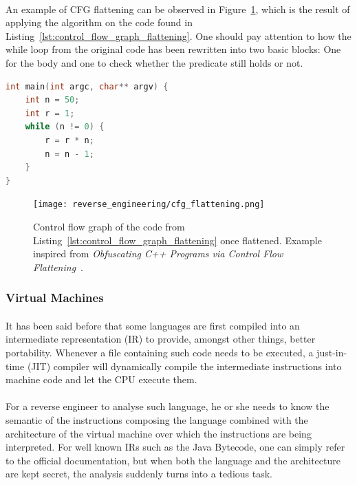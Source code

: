 \paragraph{}
An example of CFG flattening can be observed in Figure~\ref{fig:control_flow_graph_flattening}, which is the result of applying the algorithm on the code found in Listing~\ref{lst:control_flow_graph_flattening}. One should pay attention to how the while loop from the original code has been rewritten into two basic blocks: One for the body and one to check whether the predicate still holds or not.

\pagebreak

\begin{lstlisting}[caption={Simple code to compute the factorial of 50.}, label={lst:control_flow_graph_flattening}, frame=tlrb, language=C]
int main(int argc, char** argv) {
	int n = 50;
	int r = 1;
	while (n != 0) {
		r = r * n;
		n = n - 1;
	}
}
\end{lstlisting}

\begin{figure}[!htb]
	\centering
	\texttt{[image: reverse\_engineering/cfg\_flattening.png]}
	\caption{Control flow graph of the code from Listing~\ref{lst:control_flow_graph_flattening} once flattened. Example inspired from \textit{Obfuscating C++ Programs via Control Flow Flattening}~\cite{laszlo2009obfuscating}.}
	\label{fig:control_flow_graph_flattening}
\end{figure}


\subsubsection{Virtual Machines}
\paragraph{}
It has been said before that some languages are first compiled into an intermediate representation (IR) to provide, amongst other things, better portability. Whenever a file containing such code needs to be executed, a just-in-time (JIT) compiler will dynamically compile the intermediate instructions into machine code and let the CPU execute them. 

\paragraph{}
For a reverse engineer to analyse such language, he or she needs to know the semantic of the instructions composing the language combined with the architecture of the virtual machine over which the instructions are being interpreted. For well known IRs such as the Java Bytecode, one can simply refer to the official documentation, but when both the language and the architecture are kept secret, the analysis suddenly turns into a tedious task. 


